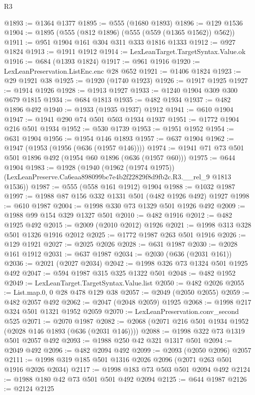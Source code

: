 \begin{lexlean}{R3}
\begin{coremodule}
@1893 := @1364 @1377
@1895 := @555 (@1680 @1893)
@1896 := @129 @1536
@1904 := @1895 (@555 (@812 @1896) (@555 (@559 (@1365 @1562)) @562))
@1911 := @951 @1904 @161 @304 @311 @333 @1816 @1333
@1912 := @927 @1824
@1913 := @1911 @1912
@1914 := LexLeanTarget.TargetSyntax.Value.ok
@1916 := @684 (@1393 @1824)
@1917 := @961 @1916
@1920 := LexLeanPreservation.ListEnc.enc @28 @652
@1921 := @1406 @1824
@1923 := @29 @1921 @38
@1925 := @1920 (@1740 @1923)
@1926 := @1917 @1925
@1927 := @1914 @1926
@1928 := @1913 @1927
@1933 := @1240 @1904 @309 @300 @679 @1815
@1934 := @684 @1813
@1935 := @482 @1934
@1937 := @482 @1896 @492
@1940 := @1933 (@1935 @1937) @1912
@1941 := @610 @1904
@1947 := @1941 @290 @74 @501 @503 @1934 @1937
@1951 := @1772 @1904 @216 @501 @1934
@1952 := @530 @1739
@1953 := @1951 @1952
@1954 := @631 @1904
@1956 := @1954 @146 @1893
@1957 := @637 @1904
@1962 := @1947 (@1953 (@1956 (@636 (@1957 @146))))
@1974 := @1941 @71 @73 @501 @501 @1896 @492 (@1954 @60 @1896 (@636 (@1957 @60)))
@1975 := @644 @1904
@1983 := @1928
    (@1940
      (@1962 (@1974 @1975))
      (LexLeanPreserve.Ca6eaa898099bc7e4b2f22829f8d9fb2c.R3.__rel_9 @1813 @1536))
@1987 := @555 (@558 @161 @1912) @1904
@1988 := @1032 @1987
@1997 := @1988 @87 @156 @332 @1331 @501 (@482 @1926 @492) @1927
@1998 := @610 @1987
@2004 := @1998 @330 @73 @1329 @501 @1926 @492
@2009 := @1988 @99 @154 @329 @1327 @501
@2010 := @482 @1916
@2012 := @482 @1925 @492
@2015 := @2009 (@2010 @2012) @1926
@2021 := @1998 @313 @328 @501 @1326 @1916 @2012
@2025 := @1772 @1987 @263 @501 @1916
@2026 := @129 @1921
@2027 := @2025 @2026
@2028 := @631 @1987
@2030 := @2028 @161 @1912
@2031 := @637 @1987
@2034 := @2030 (@636 (@2031 @161))
@2036 := @2021 (@2027 @2034)
@2042 := @1998 @326 @73 @1324 @501 @1925 @492
@2047 := @594 @1987 @315 @325 @1322 @501
@2048 := @482 @1952
@2049 := LexLeanTarget.TargetSyntax.Value.list
@2050 := @482 @2026
@2055 := List.map.{0, 0} @28 @478 @129 @38
@2057 := @2049 (@2050 @2055)
@2059 := @482 @2057 @492
@2062 := @2047 (@2048 @2059) @1925
@2068 := @1998 @217 @324 @501 @1321 @1952 @2059
@2070 := LexLeanPreservation.conv_second @525
@2071 := @2070 @1987
@2082 := @2068 (@2071 @216 @501 @1934 @1952 (@2028 @146 @1893 (@636 (@2031 @146))))
@2088 := @1998 @322 @73 @1319 @501 @2057 @492
@2093 := @1988 @250 @42 @321 @1317 @501
@2094 := @2049 @492
@2096 := @482 @2094 @492
@2099 := @2093 (@2050 @2096) @2057
@2111 := @1998 @319 @185 @501 @1316 @2026 @2096 (@2071 @263 @501 @1916 @2026 @2034)
@2117 := @1998 @183 @73 @503 @501 @2094 @492
@2124 := @1988 @180 @42 @73 @501 @501 @492 @2094
@2125 := @644 @1987
@2126 := @2124 @2125

\end{coremodule}
\end{lexlean}
